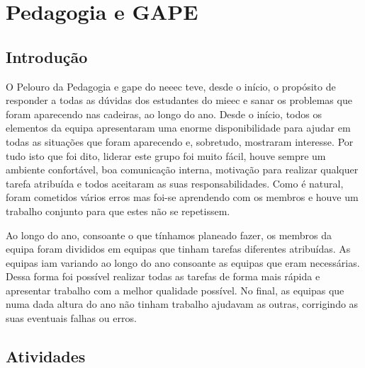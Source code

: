 
\section{Pedagogia e GAPE}

\subsection{Introdução}

O Pelouro da Pedagogia e \acrshort{gape} do \acrshort{neeec} teve, desde o início, o propósito de responder a todas as dúvidas dos estudantes do \acrshort{mieec} e sanar os problemas que foram aparecendo nas cadeiras, ao longo do ano. Desde o início, todos os elementos da equipa apresentaram uma enorme disponibilidade para ajudar em todas as situações que foram aparecendo e, sobretudo, mostraram interesse. Por tudo isto que foi dito, liderar este grupo foi muito fácil, houve sempre um ambiente confortável, boa comunicação interna, motivação para realizar qualquer tarefa atribuída e todos aceitaram as suas responsabilidades. Como é natural, foram cometidos vários erros mas foi-se aprendendo com os membros e houve um trabalho conjunto para que estes não se repetissem.

Ao longo do ano, consoante o que tínhamos planeado fazer, os membros da equipa foram divididos em equipas que tinham tarefas diferentes atribuídas. As equipas iam variando ao longo do ano consoante as equipas que eram necessárias. Dessa forma foi possível realizar todas as tarefas de forma mais rápida e apresentar trabalho com a melhor qualidade possível. No final, as equipas que numa dada altura do ano não tinham trabalho ajudavam as outras, corrigindo as suas eventuais falhas ou erros.

\subsection{Atividades}


















